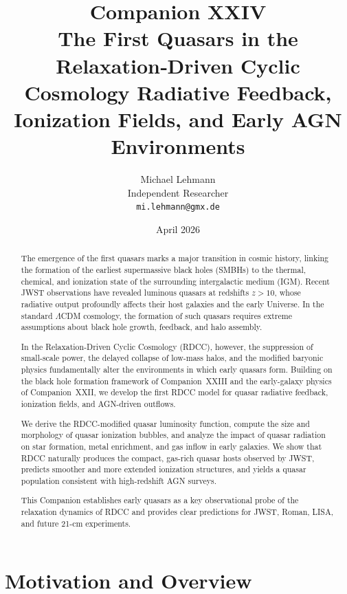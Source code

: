 \documentclass[11pt,a4paper]{article}
\title{
\textbf{Companion XXIV}\\[4mm]
\textbf{The First Quasars in the Relaxation‑Driven Cyclic Cosmology  
Radiative Feedback, Ionization Fields, and Early AGN Environments}}
\author{
Michael Lehmann\\
Independent Researcher\\
\texttt{mi.lehmann@gmx.de}
}
\date{April 2026}
\begin{document}
\maketitle

\begin{abstract}
The emergence of the first quasars marks a major transition in cosmic history, linking the 
formation of the earliest supermassive black holes (SMBHs) to the thermal, chemical, and 
ionization state of the surrounding intergalactic medium (IGM). Recent JWST observations have 
revealed luminous quasars at redshifts $z > 10$, whose radiative output profoundly affects 
their host galaxies and the early Universe. In the standard $\Lambda$CDM cosmology, the 
formation of such quasars requires extreme assumptions about black hole growth, feedback, and 
halo assembly.

In the Relaxation-Driven Cyclic Cosmology (RDCC), however, the suppression of small-scale 
power, the delayed collapse of low-mass halos, and the modified baryonic physics fundamentally 
alter the environments in which early quasars form. Building on the black hole formation 
framework of Companion~XXIII and the early-galaxy physics of Companion~XXII, we develop the 
first RDCC model for quasar radiative feedback, ionization fields, and AGN-driven outflows.

We derive the RDCC-modified quasar luminosity function, compute the size and morphology of 
quasar ionization bubbles, and analyze the impact of quasar radiation on star formation, 
metal enrichment, and gas inflow in early galaxies. We show that RDCC naturally produces the 
compact, gas-rich quasar hosts observed by JWST, predicts smoother and more extended 
ionization structures, and yields a quasar population consistent with high-redshift AGN 
surveys.

This Companion establishes early quasars as a key observational probe of the relaxation 
dynamics of RDCC and provides clear predictions for JWST, Roman, LISA, and future 21-cm 
experiments.
\end{abstract}

\section{Motivation and Overview}
\end{document}
